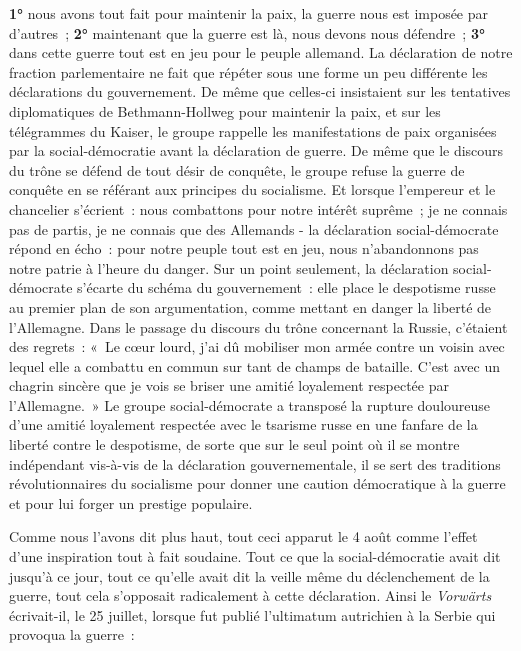 \documentclass[french,twoside]{book} %
\begin{document}
\textbf{1°} nous avons tout fait pour maintenir la paix, la guerre nous est imposée par d’autres ; \textbf{2°} maintenant que la guerre est là, nous devons nous défendre ; \textbf{3°} dans cette guerre tout est en jeu pour le peuple allemand. La déclaration de notre fraction parlementaire ne fait que répéter sous une forme un peu différente les déclarations du gouvernement. De même que celles-ci insistaient sur les tentatives diplomatiques de Bethmann-Hollweg pour maintenir la paix, et sur les télégrammes du Kaiser, le groupe rappelle les manifestations de paix organisées par la social-démocratie avant la déclaration de guerre. De  même que le discours du trône se défend de tout désir de conquête, le groupe refuse la guerre de conquête en se référant aux principes du socialisme. Et lorsque l’empereur et le chancelier s’écrient : nous combattons pour notre intérêt suprême ; je ne connais pas de partis, je ne connais que des Allemands - la déclaration social-démocrate répond en écho : pour notre peuple tout est en jeu, nous n’abandonnons pas notre patrie à l’heure du danger. Sur un point seulement, la déclaration social-démocrate s’écarte du schéma du gouvernement : elle place le despotisme russe au premier plan de son argumentation, comme mettant en danger la liberté de l’Allemagne. Dans le passage du discours du trône concernant la Russie, c’étaient des regrets : « Le cœur lourd, j’ai dû mobiliser mon armée contre un voisin avec lequel elle a combattu en commun sur tant de champs de bataille. C'est avec un chagrin sincère que je vois se briser une amitié loyalement respectée par l’Allemagne. » Le groupe social-démocrate a transposé la rupture douloureuse d’une amitié loyalement respectée avec le tsarisme russe en une fanfare de la liberté contre le despotisme, de sorte que sur le seul point où il se montre indépendant vis-à-vis de la déclaration gouvernementale, il se sert des traditions révolutionnaires du socialisme pour donner une caution démocratique à la guerre et pour lui forger un prestige populaire.\par
Comme nous l’avons dit plus haut, tout ceci apparut le 4 août comme l’effet d’une inspiration tout à fait soudaine. Tout ce que la social-démocratie avait dit jusqu’à ce jour, tout ce qu’elle avait dit la veille même du déclenchement de la guerre, tout cela s’opposait radicalement à cette déclaration. Ainsi le \emph{Vorwärts} écrivait-il, le 25 juillet, lorsque fut publié l’ultimatum autrichien à la Serbie qui provoqua la guerre :\par
\end{document}
